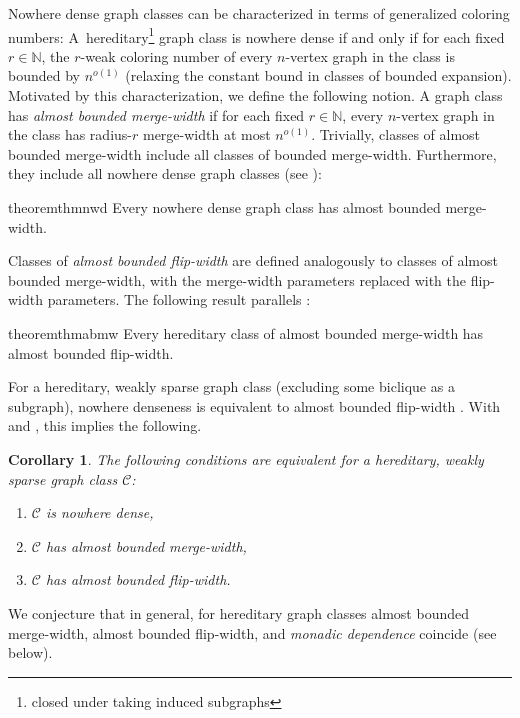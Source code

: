 \documentclass[11pt]{article}
\newtheorem{corollary}[theorem]{Corollary}
\theoremstyle{remark}
\def\cal{\mathcal}
\def\N{\mathbb N}
\newcommand{\CC}{\cal C}
\begin{document}
Nowhere dense graph classes can be characterized in terms of generalized coloring numbers:  A~hereditary\footnote{closed under taking induced subgraphs} graph class is nowhere dense if and only if for each fixed $r\in\N$, the $r$-weak coloring number of every $n$-vertex graph in the class is bounded by $n^{o(1)}$ (relaxing the constant bound in classes of bounded expansion).
Motivated by this characterization, we define the following notion.
A graph class has \emph{almost bounded merge-width} if for each fixed ${r\in\N}$,  every $n$-vertex graph in the class has radius-$r$ merge-width at most $n^{o(1)}$.
Trivially, classes of almost bounded merge-width
include all classes of bounded merge-width. Furthermore, they
 include all nowhere dense graph classes (see ):

\begin{restatable}{theorem}{thmnwd}\label{thm:nwd}
  Every nowhere dense graph class has almost bounded merge-width.
\end{restatable}



Classes of \emph{almost bounded flip-width} are defined \cite{flip-width} analogously
to classes of almost bounded merge-width,
with the merge-width parameters replaced with the flip-width parameters.
The following result parallels :
\begin{restatable}{theorem}{thmabmw}\label{thm:abmw}
  Every hereditary class of almost bounded merge-width has almost bounded flip-width.
\end{restatable}

For a hereditary, weakly sparse graph class (excluding some biclique as a subgraph), nowhere denseness is equivalent to almost bounded flip-width \cite[Thm. X.8]{flip-width}. With  and , this implies the following.
\begin{corollary}\label{cor:nd}
  The following conditions are equivalent for a hereditary, weakly sparse graph class $\CC$:
  \begin{enumerate}
    \item $\CC$ is nowhere dense,
    \item $\CC$ has almost bounded merge-width,
    \item $\CC$ has almost bounded flip-width.
  \end{enumerate}
\end{corollary}

We conjecture that in general, for hereditary graph classes almost bounded merge-width, almost bounded flip-width, and \emph{monadic dependence}
 coincide
(see  below).
\end{document}
